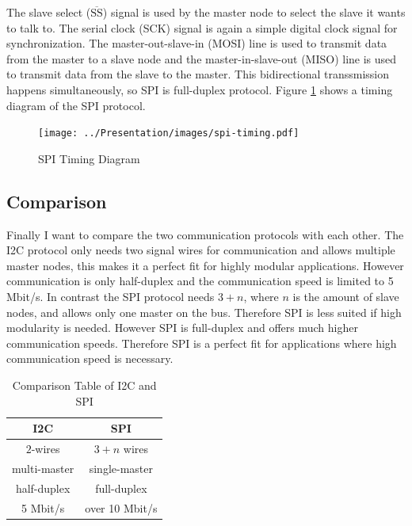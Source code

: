 \documentclass[pdftex,12pt,a4paper,fleqn]{scrartcl}
\begin{document}
The slave select ($\overline{\text{SS}}$) signal is used by the master node to select the slave it wants to talk to. The serial clock (SCK) signal is again a simple digital clock signal for synchronization. The master-out-slave-in (MOSI) line is used to transmit data from the master to a slave node and the master-in-slave-out (MISO) line is used to transmit data from the slave to the master. This bidirectional transsmission happens simultaneously, so SPI is full-duplex protocol. Figure \ref{fig:spi} shows a timing diagram of the SPI protocol.

\begin{figure}[H]	
	\centering
  \texttt{[image: ../Presentation/images/spi-timing.pdf]}
  \caption{SPI Timing Diagram}
  \label{fig:spi}
\end{figure}

\subsection{Comparison}
Finally I want to compare the two communication protocols with each other. The I2C protocol only needs two signal wires for communication and allows multiple master nodes, this makes it a perfect fit for highly modular applications. However communication is only half-duplex and the communication speed is limited to 5 Mbit/s. In contrast the SPI protocol needs $3 + n$, where $n$ is the amount of slave nodes, and allows only one master on the bus. Therefore SPI is less suited if high modularity is needed. However SPI is full-duplex and offers much higher communication speeds. Therefore SPI is a perfect fit for applications where high communication speed is necessary.

\begin{table}[H]
  \centering
  \begin{tabular}{c|c}
    \textbf{I2C} & \textbf{SPI} \\ \hline
    $2$-wires & $3 + n$ wires \\
    multi-master & single-master \\
    half-duplex & full-duplex \\
    5 Mbit/s & over 10 Mbit/s
  \end{tabular}
  \caption{Comparison Table of I2C and SPI}
  \label{table:i2c_vs_spi}
\end{table}


\nocite{*}
\newpage
\sloppy\printbibliography
\end{document}
